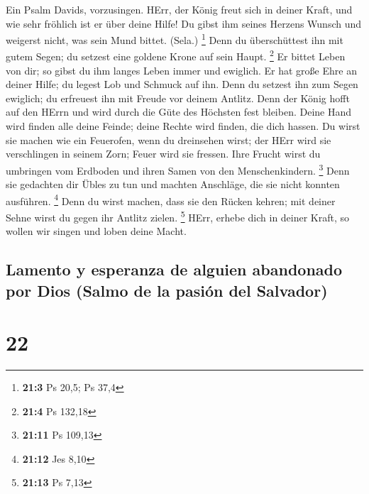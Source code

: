  Ein Psalm Davids, vorzusingen.  HErr, der
König freut sich in deiner Kraft, und wie sehr fröhlich ist er über
deine Hilfe!  Du gibst ihm seines Herzens Wunsch und
weigerst nicht, was sein Mund bittet. (Sela.) \footnote{\textbf{21:3} Ps
  20,5; Ps 37,4}  Denn du überschüttest ihn mit gutem
Segen; du setzest eine goldene Krone auf sein Haupt. \footnote{\textbf{21:4}
  Ps 132,18}  Er bittet Leben von dir; so gibst du ihm
langes Leben immer und ewiglich.  Er hat große Ehre an
deiner Hilfe; du legest Lob und Schmuck auf ihn.  Denn du
setzest ihn zum Segen ewiglich; du erfreuest ihn mit Freude vor deinem
Antlitz.  Denn der König hofft auf den HErrn und wird
durch die Güte des Höchsten fest bleiben.  Deine Hand wird
finden alle deine Feinde; deine Rechte wird finden, die dich hassen.
 Du wirst sie machen wie ein Feuerofen, wenn du
dreinsehen wirst; der HErr wird sie verschlingen in seinem Zorn; Feuer
wird sie fressen.  Ihre Frucht wirst du umbringen vom
Erdboden und ihren Samen von den Menschenkindern. \footnote{\textbf{21:11}
  Ps 109,13}  Denn sie gedachten dir Übles zu tun und
machten Anschläge, die sie nicht konnten ausführen. \footnote{\textbf{21:12}
  Jes 8,10}  Denn du wirst machen, dass sie den Rücken
kehren; mit deiner Sehne wirst du gegen ihr Antlitz zielen. \footnote{\textbf{21:13}
  Ps 7,13}  HErr, erhebe dich in deiner Kraft, so wollen
wir singen und loben deine Macht.

\hypertarget{lamento-y-esperanza-de-alguien-abandonado-por-dios-salmo-de-la-pasiuxf3n-del-salvador}{%
\subsection{Lamento y esperanza de alguien abandonado por Dios (Salmo de
la pasión del
Salvador)}\label{lamento-y-esperanza-de-alguien-abandonado-por-dios-salmo-de-la-pasiuxf3n-del-salvador}}

\hypertarget{section-21}{%
\section{22}\label{section-21}}

